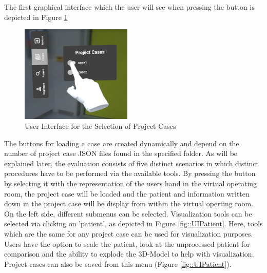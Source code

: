 The first graphical interface which the user will see when pressing the button is depicted in Figure \ref{fig::UIProjectCase}
\begin{figure}[ht]
    \centering
    \includegraphics[width=200px]{images/implementation/user_interface/project_cases.png}
    \caption{\label{fig::UIProjectCase}User Interface for the Selection of Project Cases}
\end{figure}
The buttons for loading a case are created dynamically and depend on the number of project case JSON files found in the specified folder.
As will be explained later, the evaluation consists of five distinct scenarios in which distinct procedures have to be performed via the available tools.
By pressing the button by selecting it with the representation of the users hand in the virtual operating room, the project case will be loaded and the patient and information written down in the project case will be display from within the virtual operting room.
On the left side, different submenus can be selected.
Visualization tools can be selected via clicking on 'patient', as depicted in Figure \ref{fig::UIPatient}.
Here, tools which are the same for any project case can be used for visualization purposes.
Users have the option to scale the patient, look at the unprocessed patient for comparison and the ability to explode the 3D-Model to help with visualization.
Project cases can also be saved from this menu (Figure \ref{fig::UIPatient}).

